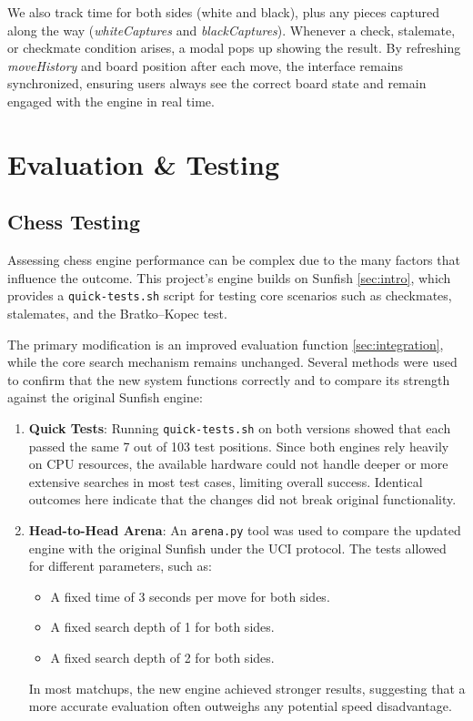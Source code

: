 \documentclass[12pt,a4paper]{article}
\begin{document}
We also track time for both sides (white and black), plus any pieces 
captured along the way (\emph{whiteCaptures} and \emph{blackCaptures}). 
Whenever a check, stalemate, or checkmate condition arises, a modal 
pops up showing the result. By refreshing \emph{moveHistory} and board 
position after each move, the interface remains synchronized, ensuring 
users always see the correct board state and remain engaged with the 
engine in real time.



\section{Evaluation \& Testing}
\subsection{Chess Testing}

Assessing chess engine performance can be complex due to the many factors that influence the outcome. This project’s engine builds on Sunfish \ref{sec:intro}, which provides a \texttt{quick-tests.sh} script for testing core scenarios such as checkmates, stalemates, and the Bratko--Kopec test.

The primary modification is an improved evaluation function \ref{sec:integration}, while the core search mechanism remains unchanged. Several methods were used to confirm that the new system functions correctly and to compare its strength against the original Sunfish engine:

\begin{enumerate}
\item \textbf{Quick Tests}: Running \texttt{quick-tests.sh} on both versions showed that each passed the same 7 out of 103 test positions. Since both engines rely heavily on CPU resources, the available hardware could not handle deeper or more extensive searches in most test cases, limiting overall success. Identical outcomes here indicate that the changes did not break original functionality.

\item \textbf{Head-to-Head Arena}: An \texttt{arena.py} tool was used to compare the updated engine with the original Sunfish under the UCI protocol. The tests allowed for different parameters, such as:
\begin{itemize}
    \item A fixed time of 3 seconds per move for both sides.
    \item A fixed search depth of 1 for both sides.
    \item A fixed search depth of 2 for both sides.
\end{itemize}
In most matchups, the new engine achieved stronger results, suggesting that a more accurate evaluation often outweighs any potential speed disadvantage.
\end{enumerate}
\end{document}
